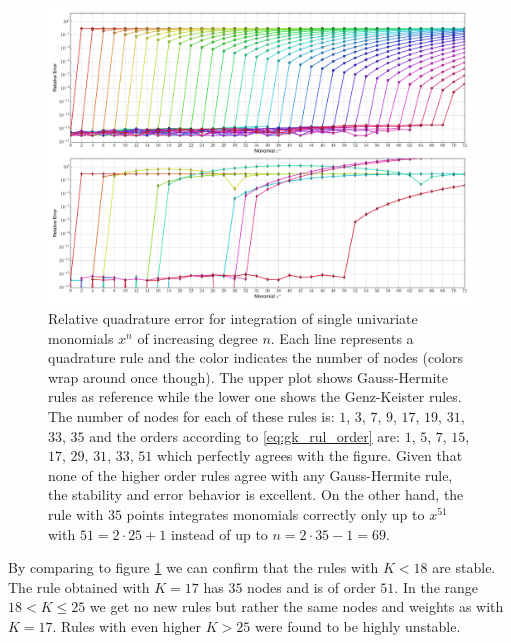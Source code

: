 \documentclass[a4paper,10pt]{article}
\begin{document}
\begin{figure}
  \centering
  \includegraphics[width=\linewidth]{./img/monomial_errors_hermitephy.pdf}
  \caption{Relative quadrature error for integration of single univariate monomials $x^n$ of increasing degree $n$.
  Each line represents a quadrature rule and the color indicates the number of nodes (colors wrap around once though).
  The upper plot shows Gauss-Hermite rules as reference while the lower one shows the Genz-Keister rules.
  The number of nodes for each of these rules is:
  $1$, $3$, $7$,  $9$, $17$, $19$, $31$, $33$, $35$
  and the orders according to \eqref{eq:gk_rul_order} are:
  $1$, $5$, $7$, $15$, $17$, $29$, $31$, $33$, $51$
  which perfectly agrees with the figure. Given that none of the higher order rules agree with any Gauss-Hermite rule,
  the stability and error behavior is excellent. On the other hand, the rule with $35$ points integrates monomials
  correctly only up to $x^{51}$ with $51 = 2 \cdot 25 + 1$ instead of up to $n = 2 \cdot 35 - 1 = 69$.}
  \label{fig:conv_monom_hermite}
\end{figure}

By comparing to figure \ref{fig:conv_monom_hermite} we can confirm that the rules with $K < 18$ are stable.
The rule obtained with $K=17$ has $35$ nodes and is of order $51$. In the range $18 < K \leq 25$ we get no
new rules but rather the same nodes and weights as with $K = 17$. Rules with even higher $K > 25$ were found
to be highly unstable.
\end{document}
